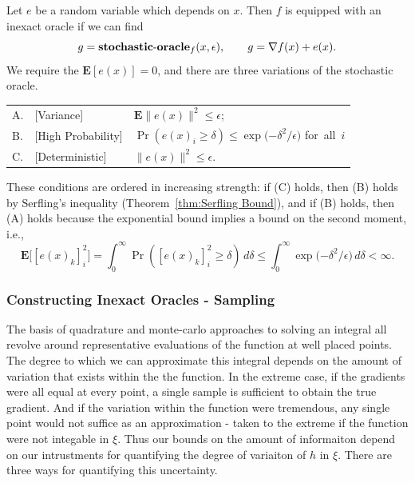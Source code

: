 \begin{defn} \label{defn: 0-1 Epsilon Oracle} Let $e$ be a 
random variable which depends on $x$. Then $f$ is equipped with an inexact oracle if we can find
$$
g=\mbox{{\bf stochastic}-{\bf oracle}}_f(x,\epsilon), \qquad g =\nabla f(x)+e(x).
$$
We require the $\mathbf{E}[e(x)] = 0$, and there are three variations of the
stochastic oracle.

\vspace{2mm}
\begin{tabular}{l@{\ }ll}
  A. &[Variance] &$\mathbf{E} \|e(x)\|^2 \leq \epsilon$;
  \\[6pt]
  B. &[High Probability] & $
  \Pr\left(e(x)_i \geq\delta \right)
  \leq\exp\big({-\delta^{2}/\epsilon}\big)$ \quad \mbox{for all $i$}
\\[6pt]
C. &[Deterministic] &$\|e(x)\|^2 \leq \epsilon$.
\end{tabular}
\end{defn}

These conditions are ordered in increasing strength: if (C) holds,
then (B) holds by Serfling's inequality
(Theorem~\ref{thm:Serfling Bound}), and if (B) holds, then
(A) holds because the exponential bound implies a bound on the second
moment, i.e.,
\[
\mathbf{E} \big[[e(x)_{k}]_{i}^{2}\big] = \int_{0}^{\infty}\!\! 
\Pr([e(x)_{k}]_{i}^{2} \geq \delta)\,d\delta \leq \int_{0}^{\infty}\!\!
\exp\big({-\delta^{2}/\epsilon}\big)\,d\delta < \infty.
\]

\subsubsection{Constructing Inexact Oracles - Sampling} The basis of
quadrature and monte-carlo approaches to solving an integral all revolve
around representative evaluations of the function at well placed points. The
degree to which we can approximate this integral depends on the amount of
variation that exists within the the function. In the extreme case, if the
gradients were all equal at every point, a single sample is sufficient to
obtain the true gradient. And if the variation within the function were
tremendous, any single point would not suffice as an approximation - taken
to the extreme if the function were not integable in $\xi$. Thus our bounds
on the amount of informaiton depend on our intrustments for quantifying
the degree of variaiton of $h$ in $\xi$. There are three ways for quantifying 
this uncertainty.


